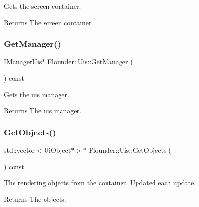 Gets the screen container. 

\begin{DoxyReturn}{Returns}
The screen container. 
\end{DoxyReturn}
\mbox{\label{class_flounder_1_1_uis_ace96fb2e4ff722c50d69d6809768e190}} 
\subsubsection{\texorpdfstring{Get\+Manager()}{GetManager()}}
{\footnotesize\ttfamily \hyperlink{class_flounder_1_1_i_manager_uis}{I\+Manager\+Uis}$\ast$ Flounder\+::\+Uis\+::\+Get\+Manager (\begin{DoxyParamCaption}{ }\end{DoxyParamCaption}) const\hspace{0.3cm}{\ttfamily [inline]}}



Gets the uis manager. 

\begin{DoxyReturn}{Returns}
The uis manager. 
\end{DoxyReturn}
\mbox{\label{class_flounder_1_1_uis_aa70e4674ef72303797b75b096deb86bc}} 
\subsubsection{\texorpdfstring{Get\+Objects()}{GetObjects()}}
{\footnotesize\ttfamily std\+::vector$<$Ui\+Object$\ast$$>$$\ast$ Flounder\+::\+Uis\+::\+Get\+Objects (\begin{DoxyParamCaption}{ }\end{DoxyParamCaption}) const\hspace{0.3cm}{\ttfamily [inline]}}



The rendering objects from the container. Updated each update. 

\begin{DoxyReturn}{Returns}
The objects. 
\end{DoxyReturn}
\mbox{\label{class_flounder_1_1_uis_abf39b143497e3c9b72b4c847ec3128bb}} 
